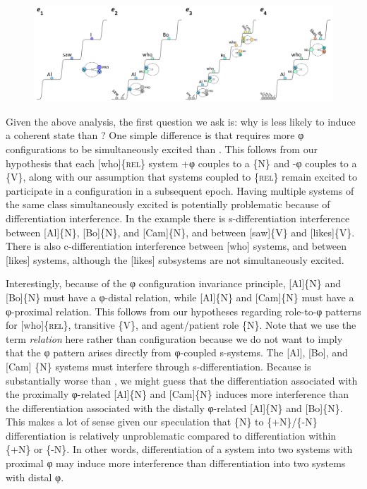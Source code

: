   
\begin{figure}
\includegraphics[width=\textwidth]{figures/Tilsen-img132.png}
\caption{\missingcaption}
\label{fig:6:13}
\end{figure}
 

  Given the above analysis, the first question we ask is: why is  less likely to induce a coherent state than ? One simple difference is that  requires more φ configurations to be simultaneously excited than . This follows from our hypothesis that each [who]\{\textsc{rel}\} system +φ couples to a \{N\} and -φ couples to a \{V\}, along with our assumption that systems coupled to \{\textsc{rel}\} remain excited to participate in a configuration in a subsequent epoch. Having multiple systems of the same class simultaneously excited is potentially problematic because of differentiation interference. In the example there is s-differentiation interference between [Al]\{N\}, [Bo]\{N\}, and [Cam]\{N\}, and between [saw]\{V\} and [likes]\{V\}. There is also c-differentiation interference between [who] systems, and between [likes] systems, although the [likes] subsystems are not simultaneously excited. 

  Interestingly, because of the φ configuration invariance principle, [Al]\{N\} and [Bo]\{N\} must have a φ-distal relation, while [Al]\{N\} and [Cam]\{N\} must have a φ-proximal relation. This follows from our hypotheses regarding role-to-φ patterns for [who]\{\textsc{rel}\}, transitive \{V\}, and agent/patient role \{N\}. Note that we use the term \textit{relation} here rather than configuration because we do not want to imply that the φ pattern arises directly from φ-coupled s-systems. The [Al], [Bo], and [Cam] \{N\} systems must interfere through s-differentiation. Because  is substantially worse than , we might guess that the differentiation associated with the proximally φ-related [Al]\{N\} and [Cam]\{N\} induces more interference than the differentiation associated with the distally φ-related [Al]\{N\} and [Bo]\{N\}. This makes a lot of sense given our speculation that \{N\} to \{+N\}/\{-N\} differentiation is relatively unproblematic compared to differentiation within \{+N\} or \{-N\}. In other words, differentiation of a system into two systems with proximal φ may induce more interference than differentiation into two systems with distal φ.

